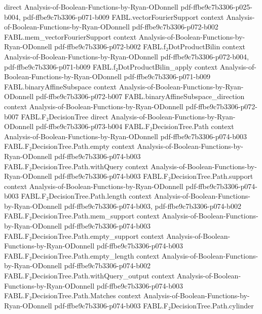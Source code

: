 \begin{theorem}
  {direct}
  {Analysis-of-Boolean-Functions-by-Ryan-ODonnell}
  {pdf-ffbe9c7b3306-p025-b004,
    pdf-ffbe9c7b3306-p071-b009}
\proofstep
  {FABL.vectorFourierSupport}
  {context}
  {Analysis-of-Boolean-Functions-by-Ryan-ODonnell}
  {pdf-ffbe9c7b3306-p072-b002}
\proofstep
  {FABL.mem_vectorFourierSupport}
  {context}
  {Analysis-of-Boolean-Functions-by-Ryan-ODonnell}
  {pdf-ffbe9c7b3306-p072-b002}
\proofstep
  {FABL.f₂DotProductBilin}
  {context}
  {Analysis-of-Boolean-Functions-by-Ryan-ODonnell}
  {pdf-ffbe9c7b3306-p072-b004,
    pdf-ffbe9c7b3306-p071-b009}
\proofstep
  {FABL.f₂DotProductBilin_apply}
  {context}
  {Analysis-of-Boolean-Functions-by-Ryan-ODonnell}
  {pdf-ffbe9c7b3306-p071-b009}
\proofstep
  {FABL.binaryAffineSubspace}
  {context}
  {Analysis-of-Boolean-Functions-by-Ryan-ODonnell}
  {pdf-ffbe9c7b3306-p072-b007}
\proofstep
  {FABL.binaryAffineSubspace_direction}
  {context}
  {Analysis-of-Boolean-Functions-by-Ryan-ODonnell}
  {pdf-ffbe9c7b3306-p072-b007}
\proofstep
  {FABL.F₂DecisionTree}
  {direct}
  {Analysis-of-Boolean-Functions-by-Ryan-ODonnell}
  {pdf-ffbe9c7b3306-p073-b004}
\proofstep
  {FABL.F₂DecisionTree.Path}
  {context}
  {Analysis-of-Boolean-Functions-by-Ryan-ODonnell}
  {pdf-ffbe9c7b3306-p074-b003}
\proofstep
  {FABL.F₂DecisionTree.Path.empty}
  {context}
  {Analysis-of-Boolean-Functions-by-Ryan-ODonnell}
  {pdf-ffbe9c7b3306-p074-b003}
\proofstep
  {FABL.F₂DecisionTree.Path.withQuery}
  {context}
  {Analysis-of-Boolean-Functions-by-Ryan-ODonnell}
  {pdf-ffbe9c7b3306-p074-b003}
\proofstep
  {FABL.F₂DecisionTree.Path.support}
  {context}
  {Analysis-of-Boolean-Functions-by-Ryan-ODonnell}
  {pdf-ffbe9c7b3306-p074-b003}
\proofstep
  {FABL.F₂DecisionTree.Path.length}
  {context}
  {Analysis-of-Boolean-Functions-by-Ryan-ODonnell}
  {pdf-ffbe9c7b3306-p074-b003,
    pdf-ffbe9c7b3306-p074-b002}
\proofstep
  {FABL.F₂DecisionTree.Path.mem_support}
  {context}
  {Analysis-of-Boolean-Functions-by-Ryan-ODonnell}
  {pdf-ffbe9c7b3306-p074-b003}
\proofstep
  {FABL.F₂DecisionTree.Path.empty_support}
  {context}
  {Analysis-of-Boolean-Functions-by-Ryan-ODonnell}
  {pdf-ffbe9c7b3306-p074-b003}
\proofstep
  {FABL.F₂DecisionTree.Path.empty_length}
  {context}
  {Analysis-of-Boolean-Functions-by-Ryan-ODonnell}
  {pdf-ffbe9c7b3306-p074-b002}
\proofstep
  {FABL.F₂DecisionTree.Path.withQuery_output}
  {context}
  {Analysis-of-Boolean-Functions-by-Ryan-ODonnell}
  {pdf-ffbe9c7b3306-p074-b003}
\proofstep
  {FABL.F₂DecisionTree.Path.Matches}
  {context}
  {Analysis-of-Boolean-Functions-by-Ryan-ODonnell}
  {pdf-ffbe9c7b3306-p074-b003}
\proofstep
  {FABL.F₂DecisionTree.Path.cylinder}

\end{theorem}
